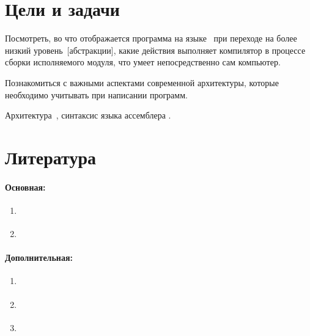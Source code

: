 
\section{Цели и задачи}
Посмотреть, во что отображается программа на языке~ при переходе на более низкий уровень~[абстракции], какие действия выполняет компилятор в процессе сборки исполняемого модуля, что умеет непосредственно сам компьютер.

Познакомиться с важными аспектами современной архитектуры, которые необходимо учитывать при написании программ.

Архитектура \,, синтаксис языка ассемблера .



\section{Литература}

\paragraph{Основная:}
\begin{enumerate}
  \item \cite{Harris:2015:ru}
  \item \cite{Bryant:2022:ru}
\end{enumerate}



\paragraph{Дополнительная:}
\begin{enumerate}[resume]
  \item \cite{Tanenbaum:2013:ru}
  \item \cite{Vorozhcov:2008:ru}
  \item \cite{Pacheco:2011:en}
\end{enumerate}
\nocite{WikiBookAsm:ru, Zubkov:2000:ru}



